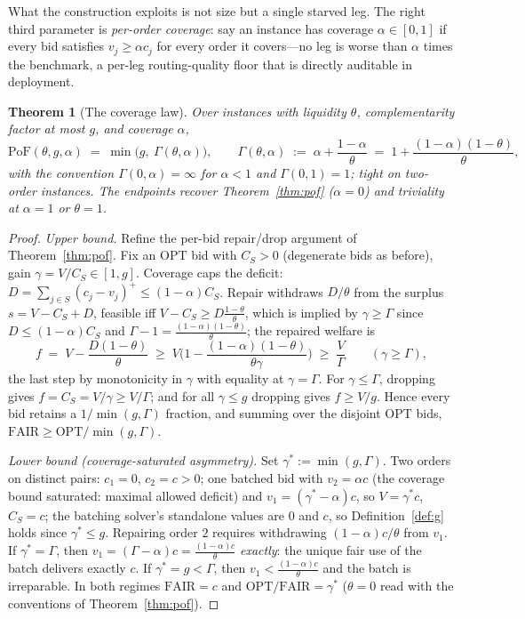 \documentclass[11pt]{article}
\newtheorem{theorem}{Theorem}
\theoremstyle{remark}
\newcommand{\OPT}{\mathrm{OPT}}
\newcommand{\FAIR}{\mathrm{FAIR}}
\newcommand{\PoF}{\mathrm{PoF}}
\begin{document}
What the construction exploits is not size but a single starved leg. The
right third parameter is \emph{per-order coverage}: say an instance has
coverage $\alpha\in[0,1]$ if every bid satisfies $v_j\ge\alpha c_j$ for
every order it covers---no leg is worse than $\alpha$ times the
benchmark, a per-leg routing-quality floor that is directly auditable in
deployment.

\begin{theorem}[The coverage law]\label{thm:coverage}
Over instances with liquidity $\theta$, complementarity factor at most
$g$, and coverage $\alpha$,
\[
\PoF(\theta,g,\alpha)\;=\;\min\!\big(g,\ \Gamma(\theta,\alpha)\big),
\qquad
\Gamma(\theta,\alpha)\;:=\;\alpha+\frac{1-\alpha}{\theta}
\;=\;1+\frac{(1-\alpha)(1-\theta)}{\theta},
\]
with the convention $\Gamma(0,\alpha)=\infty$ for $\alpha<1$ and
$\Gamma(0,1)=1$; tight on two-order instances. The endpoints recover
Theorem~\ref{thm:pof} ($\alpha=0$) and triviality at $\alpha=1$ or
$\theta=1$.
\end{theorem}

\begin{proof}
\emph{Upper bound.} Refine the per-bid repair/drop argument of
Theorem~\ref{thm:pof}. Fix an OPT bid with $C_S>0$ (degenerate bids as
before), gain $\gamma=V/C_S\in[1,g]$. Coverage caps the deficit:
$D=\sum_{j\in S}(c_j-v_j)^+\le(1-\alpha)C_S$. Repair withdraws
$D/\theta$ from the surplus $s=V-C_S+D$, feasible iff
$V-C_S\ge D\frac{1-\theta}{\theta}$, which is implied by
$\gamma\ge\Gamma$ since $D\le(1-\alpha)C_S$ and
$\Gamma-1=\frac{(1-\alpha)(1-\theta)}{\theta}$; the repaired welfare is
\[
f\;=\;V-\frac{D(1-\theta)}{\theta}
\;\ge\;V\Big(1-\frac{(1-\alpha)(1-\theta)}{\theta\gamma}\Big)
\;\ge\;\frac{V}{\Gamma}
\qquad(\gamma\ge\Gamma),
\]
the last step by monotonicity in $\gamma$ with equality at
$\gamma=\Gamma$. For $\gamma\le\Gamma$, dropping gives
$f=C_S=V/\gamma\ge V/\Gamma$; and for all $\gamma\le g$ dropping gives
$f\ge V/g$. Hence every bid retains a $1/\min(g,\Gamma)$ fraction, and
summing over the disjoint OPT bids, $\FAIR\ge\OPT/\min(g,\Gamma)$.

\emph{Lower bound (coverage-saturated asymmetry).} Set
$\gamma^\ast:=\min(g,\Gamma)$. Two orders on distinct pairs: $c_1=0$,
$c_2=c>0$; one batched bid with $v_2=\alpha c$ (the coverage bound
saturated: maximal allowed deficit) and $v_1=(\gamma^\ast-\alpha)c$, so
$V=\gamma^\ast c$, $C_S=c$; the batching solver's standalone values are
$0$ and $c$, so Definition~\ref{def:g} holds since $\gamma^\ast\le g$.
Repairing order $2$ requires withdrawing $(1-\alpha)c/\theta$ from
$v_1$. If $\gamma^\ast=\Gamma$, then
$v_1=(\Gamma-\alpha)c=\frac{(1-\alpha)c}{\theta}$ \emph{exactly}: the
unique fair use of the batch delivers exactly $c$. If
$\gamma^\ast=g<\Gamma$, then $v_1<\frac{(1-\alpha)c}{\theta}$ and the
batch is irreparable. In both regimes $\FAIR=c$ and
$\OPT/\FAIR=\gamma^\ast$ ($\theta=0$ read with the conventions of
Theorem~\ref{thm:pof}).
\end{proof}
\end{document}

